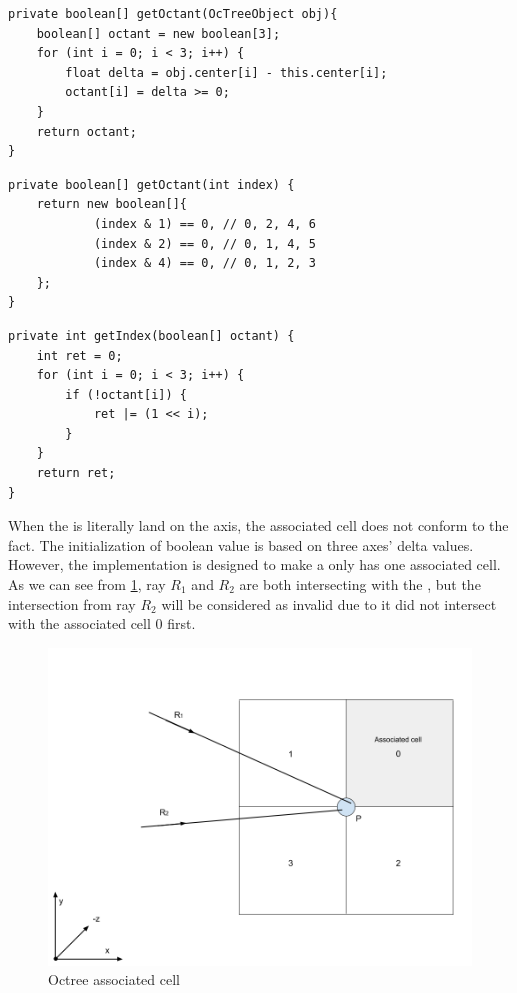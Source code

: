 \begin{lstlisting}[language=Android]
private boolean[] getOctant(OcTreeObject obj){
	boolean[] octant = new boolean[3];
	for (int i = 0; i < 3; i++) {
		float delta = obj.center[i] - this.center[i];
		octant[i] = delta >= 0;
	}
	return octant;
}
\end{lstlisting}

\begin{lstlisting}[language=Android]
private boolean[] getOctant(int index) {
	return new boolean[]{
			(index & 1) == 0, // 0, 2, 4, 6
			(index & 2) == 0, // 0, 1, 4, 5
			(index & 4) == 0, // 0, 1, 2, 3
	};
}
\end{lstlisting}

\begin{lstlisting}[language=Android]
private int getIndex(boolean[] octant) {
	int ret = 0;
	for (int i = 0; i < 3; i++) {
		if (!octant[i]) {
			ret |= (1 << i);
		}
	}
	return ret;
}
\end{lstlisting}

When the  is literally land on the axis, the associated cell does not conform to the fact. The initialization of boolean  value is based on three axes' delta values. However, the implementation is designed to make a  only has one associated cell. As we can see from \ref{fig:octree-associated-cell}, ray $R_1$ and $R_2$ are both intersecting with the , but the intersection from ray $R_2$ will be considered as invalid due to it did not intersect with the associated cell $0$ first.

\begin{figure}[H]
	\caption{Octree associated cell}
	\label{fig:octree-associated-cell}
	\centering
	\includegraphics[width=\textwidth, keepaspectratio]{Figures/octree-associated-cell.png}
	\decoRule
\end{figure}

